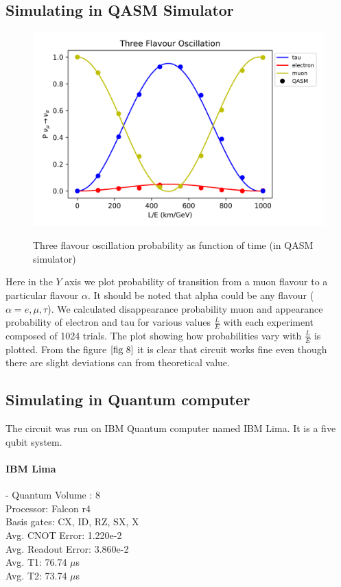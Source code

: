\documentclass[12pt,a4paper]{report}
\begin{document}
\subsection{Simulating in QASM Simulator}
\begin{figure}[H]
	\graphicspath{ {./Images/} }	
	{\includegraphics[scale=0.8]{fig_8.png}}
	\centering\caption{ Three flavour oscillation probability as function of time (in QASM simulator)}
		\label{fig 8}
	\end{figure}
Here in the $Y$ axis we plot probability of transition from a muon flavour to a particular flavour $\alpha$. It should be noted that alpha could be any flavour ($\alpha=e,\mu,\tau$). We calculated disappearance probability muon and appearance probability of electron and tau for various values $\frac{L}{E}$ with each experiment composed of 1024 trials. The plot showing how probabilities vary with $\frac{L}{E}$ is plotted.
	From the figure $\ref{fig 8}$ it is clear that circuit works fine even though there are slight deviations can from theoretical value.
\subsection{Simulating in Quantum computer}
The circuit was run on IBM Quantum computer named IBM Lima. It is a five qubit system.
\paragraph{\textbf{IBM Lima}}
- Quantum Volume : 8\\
Processor: Falcon r4\\
Basis gates: CX, ID, RZ, SX, X\\
Avg. CNOT Error: 1.220e-2\\
Avg. Readout Error: 3.860e-2\\
Avg. T1: 76.74 $\mu$s\\
Avg. T2: 73.74 $\mu$s\\
\end{document}
